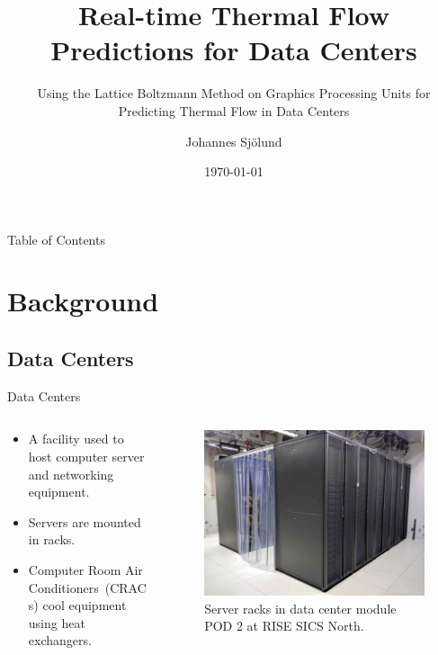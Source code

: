 \documentclass{beamer}
\title[Real-time Thermal Flow Predictions for Data Centers]{Real-time Thermal Flow\\Predictions for Data Centers}
\subtitle{\scriptsize Using the Lattice Boltzmann Method on Graphics Processing Units
for Predicting Thermal Flow in Data Centers}
\author[]{Johannes Sjölund}
\institute{}
\date{\today}
\begin{document}
\begin{frame}
  \titlepage
\end{frame}

\begin{frame}{Table of Contents}
\tableofcontents
\end{frame}

\section{Background}
\subsection{Data Centers}
\begin{frame}{Data Centers}
\begin{columns}[T]%
\begin{column}{.6\textwidth}
\begin{itemize}
\item A facility used to host computer server and networking equipment.
\item Servers are mounted in racks.
\item Computer Room Air Conditioners~(CRACs) cool equipment using heat exchangers.
\end{itemize}
\end{column}%
\hfill%
\begin{column}{.6\textwidth}
\begin{figure}[!htb]
\centering
\begin{tiny}%
\includegraphics[width=1.0\linewidth]{pod2_interior.jpg}
\end{tiny}
\caption{Server racks in data center module POD 2 at RISE SICS North.}
\end{figure}
\end{column}%
\end{columns}
\end{frame}
\end{document}

